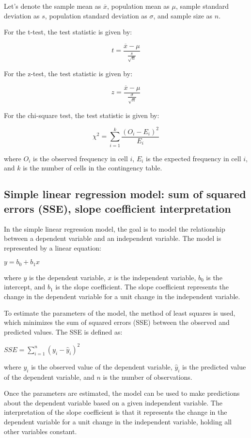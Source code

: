 \documentclass[12pt, a4paper, oneside]{article}
\begin{document}
Let's denote the sample mean as $\overline{x}$, population mean as $\mu$, sample standard deviation as $s$, population standard deviation as $\sigma$, and sample size as $n$.

For the t-test, the test statistic is given by:

$$t = \frac{\overline{x} - \mu}{\frac{s}{\sqrt{n}}}$$

For the z-test, the test statistic is given by:

$$z = \frac{\overline{x} - \mu}{\frac{\sigma}{\sqrt{n}}}$$

For the chi-square test, the test statistic is given by:

$$\chi^2 = \sum_{i=1}^{k} \frac{(O_i - E_i)^2}{E_i}$$

where $O_i$ is the observed frequency in cell $i$, $E_i$ is the expected frequency in cell $i$, and $k$ is the number of cells in the contingency table.

\subsection{ Simple linear regression model: sum of squared errors (SSE), slope coefficient interpretation }
In the simple linear regression model, the goal is to model the relationship between a dependent variable and an independent variable. The model is represented by a linear equation:

$y = b_0 + b_1x$

where $y$ is the dependent variable, $x$ is the independent variable, $b_0$ is the intercept, and $b_1$ is the slope coefficient. The slope coefficient represents the change in the dependent variable for a unit change in the independent variable.

To estimate the parameters of the model, the method of least squares is used, which minimizes the sum of squared errors (SSE) between the observed and predicted values. The SSE is defined as:

$SSE = \sum_{i=1}^n (y_i - \hat{y}_i)^2$

where $y_i$ is the observed value of the dependent variable, $\hat{y}_i$ is the predicted value of the dependent variable, and $n$ is the number of observations.

Once the parameters are estimated, the model can be used to make predictions about the dependent variable based on a given independent variable. The interpretation of the slope coefficient is that it represents the change in the dependent variable for a unit change in the independent variable, holding all other variables constant.
\end{document}
